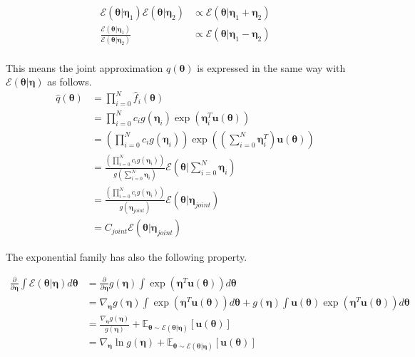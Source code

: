 \documentclass[a4]{article}
\begin{document}
\begin{equation}
\begin{aligned}
\mathcal{E}(\bm{\theta}|\bm{\eta}_1)\mathcal{E}(\bm{\theta}|\bm{\eta}_2)
&\propto \mathcal{E}(\bm{\theta}|\bm{\eta}_1+\bm{\eta}_2)\\
\frac{\mathcal{E}(\bm{\theta}|\bm{\eta}_1)}{\mathcal{E}(\bm{\theta}|\bm{\eta}_2)}
&\propto \mathcal{E}(\bm{\theta}|\bm{\eta}_1-\bm{\eta}_2)\\
\end{aligned}
\end{equation}

This means the joint approximation $q(\bm{\theta})$ is expressed in the same way with 
$\mathcal{E}(\bm{\theta} | \bm{\eta})$ as follows.
\begin{equation}
\begin{aligned}
\hat{q}(\bm{\theta}) &= \prod_{i=0}^N \hat{f}_i(\bm{\theta})\\
&= \prod_{i=0}^N c_ig(\bm{\eta}_i)\exp\left(\bm{\eta}_i^T\bm{u}(\bm{\theta})\right)\\
&= \left(\prod_{i=0}^N c_ig(\bm{\eta}_i)\right)
\exp\left(\left(\sum_{i=0}^N\bm{\eta}_i^T\right)\bm{u}(\bm{\theta})\right)\\
&= \frac{\left(\prod_{i=0}^N c_ig(\bm{\eta}_i)\right)}
{g\left(\sum_{i=0}^N\bm{\eta}_i\right)}\mathcal{E}(\bm{\theta}|\sum_{i=0}^N\bm{\eta}_i)\\
&= \frac{\left(\prod_{i=0}^N c_ig(\bm{\eta}_i)\right)}
{g\left(\bm{\eta}_{joint}\right)}\mathcal{E}(\bm{\theta} | \bm{\eta}_{joint})\\
&= C_{joint}\mathcal{E}(\bm{\theta} | \bm{\eta}_{joint})
\end{aligned}
\end{equation}



The exponential family has also the following property.

\begin{equation}
\begin{aligned}
\frac{\partial}{\partial \bm{\eta}}\int \mathcal{E}(\bm{\theta}|\bm{\eta}) d\bm{\theta}&=
\frac{\partial}{\partial \bm{\eta}}g(\bm{\eta})\int\exp\left(\bm{\eta}^T\bm{u}(\bm{\theta})\right)d\bm{\theta}\\
&=
\nabla_{\bm{\eta}}g(\bm{\eta})\int\exp\left(\bm{\eta}^T\bm{u}(\bm{\theta})\right)d\bm{\theta} + 
g(\bm{\eta})\int\bm{u}(\bm{\theta})\exp\left(\bm{\eta}^T\bm{u}(\bm{\theta})\right)d\bm{\theta}\\
&=
\frac{\nabla_{\bm{\eta}}g(\bm{\eta})}{g(\bm{\eta})} +
\mathbb{E}_{\bm{\theta} \sim \mathcal{E}(\bm{\theta}|\bm{\eta})} [\bm{u}(\bm{\theta})]\\
&=
\nabla_{\bm{\eta}}\ln g(\bm{\eta}) + 
\mathbb{E}_{\bm{\theta} \sim \mathcal{E}(\bm{\theta}|\bm{\eta})} [\bm{u}(\bm{\theta})]
\end{aligned}
\end{equation}
\end{document}
